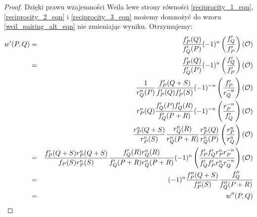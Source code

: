 \begin{proof}
\noindent
Dzięki prawu wzajemności Weila lewe strony równości
\ref{reciprocity_1_eqn}, \ref{reciprocity_2_eqn} i \ref{reciprocity_3_eqn}
możemy domnożyć do wzoru \ref{weil_pairing_alt_eqn}
nie zmieniając wyniku.
Otrzymujemy:
\begin{eqnarray*}
w'(P,Q)
& = & \frac{f_P'(Q)}{f_Q'(P)}(-1)^n\left(\frac{f_Q'}{f_P'}\right)(\mathcal{O}) \\
& = & \frac{f_P'(Q)}{f_Q'(P)}(-1)^n\left(\frac{f_Q'}{f_P'}\right)(\mathcal{O}) \\
&   & \frac{1}{r_Q^n(P)}\frac{f_P'(Q+S)}{f_P'(Q)f_P'(S)}
      (-1)^{-n}\left(\frac{f_P'}{r_Q^{-n}}\right)(\mathcal{O}) \\
&   & r_P^n(Q)\frac{f_Q'(P)f_Q'(R)}{f_Q'(P+R)}
      (-1)^{-n}\left(\frac{r_P^{-n}}{f_Q'}\right)(\mathcal{O}) \\
&   & \frac{r_P^n(Q+S)}{r_P^n(S)}
      \frac{r_Q^n(R)}{r_Q^n(P+R)}
      \frac{r_P^n(Q)}{r_Q^n(P)}
      \left(\frac{r_P^n}{r_Q^n}\right)(\mathcal{O}) \\
& = & \frac{f_P'(Q+S)r_P^n(Q+S)}{f_P(S)r_P^n(S)}
      \frac{f_Q'(R)r_Q^n(R)}{f_Q'(P+R)r_Q^n(P+R)}
      (-1)^n\left(
      \frac{f_P'f_Q'r_P^nr_P^{-n}}{f_Q'f_P'r_Q^nr_Q^{-n}}
      \right)(\mathcal{O}) \\
& = & (-1)^n\frac{f_P''(Q+S)}{f_P''(S)}
      \frac{f_Q''}{f_Q''(P+R)} \\
& = & w''(P,Q)
\end{eqnarray*}
\end{proof}
